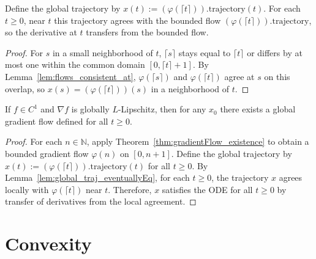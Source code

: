 \begin{lemma}
  \label{lem:global_traj_eventuallyEq}
  \leanok{}
  Define the global trajectory by $x(t):=(\varphi(\lceil t\rceil)).\text{trajectory}(t)$.
  For each $t\ge 0$, near $t$ this trajectory agrees with the bounded flow $(\varphi(\lceil t\rceil)).\text{trajectory}$,
  so the derivative at $t$ transfers from the bounded flow.
\end{lemma}
\begin{proof}
  \leanok{}
  For $s$ in a small neighborhood of $t$, $\lceil s\rceil$ stays equal to $\lceil t\rceil$ or differs
  by at most one within the common domain $[0,\lceil t\rceil+1]$. By
  Lemma~\ref{lem:flows_consistent_at}, $\varphi(\lceil s\rceil)$ and $\varphi(\lceil t\rceil)$ agree
  at $s$ on this overlap, so $x(s)=(\varphi(\lceil t\rceil))(s)$ in a neighborhood of $t$.
\end{proof}

\begin{theorem}
  \label{thm:gradientFlowGlobal_existence}
  \leanok{}
  If $f\in C^1$ and $\nabla f$ is globally $L$-Lipschitz, then for any $x_0$
  there exists a global gradient flow defined for all $t\ge 0$.
\end{theorem}

\begin{proof}
  \leanok{}
  For each $n\in\mathbb{N}$, apply Theorem~\ref{thm:gradientFlow_existence} to obtain a bounded gradient flow $\varphi(n)$ on $[0,n+1]$.
  Define the global trajectory by $x(t):=(\varphi(\lceil t\rceil)).\text{trajectory}(t)$ for all $t\ge 0$.
  By Lemma~\ref{lem:global_traj_eventuallyEq}, for each $t\ge 0$, the trajectory $x$ agrees locally with $\varphi(\lceil t\rceil)$ near $t$.
  Therefore, $x$ satisfies the ODE for all $t\ge 0$ by transfer of derivatives from the local agreement.
\end{proof}



\chapter{Convexity}\label{sec:convexity}


